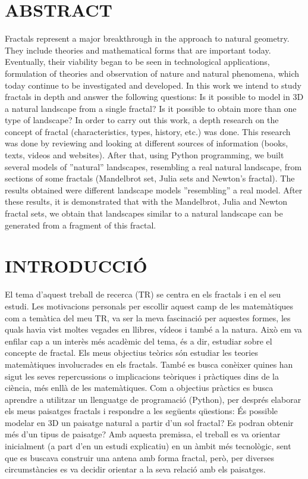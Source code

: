 \documentclass[12pt,a4paper]{report}
\begin{document}
\chapter*{ABSTRACT}
Fractals represent a major breakthrough in the approach to natural geometry. They include theories and mathematical forms that are important today. Eventually, their viability began to be seen in technological applications, formulation of theories and observation of nature and natural phenomena, which today continue to be investigated and developed. In this work we intend to study fractals in depth and answer the following questions: Is it possible to model in 3D a natural landscape from a single fractal? Is it possible to obtain more than one type of landscape? In order to carry out this work, a depth research on the concept of fractal (characteristics, types, history, etc.) was done. This research was done by reviewing and looking at different sources of information (books, texts, videos and websites). After that, using Python programming, we built several models of ''natural'' landscapes, resembling a real natural landscape, from sections of some fractals (Mandelbrot set, Julia sets and Newton's fractal). The results obtained were different landscape models ''resembling'' a real model. After these results, it is demonstrated that with the Mandelbrot, Julia and Newton fractal sets, we obtain that landscapes similar to a natural landscape can be generated from a fragment of this fractal.

\chapter{INTRODUCCIÓ}
El tema d’aquest treball de recerca (TR) se centra en els fractals i en el seu estudi. Les motivacions personals per escollir aquest camp de les matemàtiques com a temàtica del meu TR, va ser la meva fascinació per aquestes formes, les quals havia vist moltes vegades en llibres, vídeos i també a la natura. Això em va enfilar cap a un interès més acadèmic del tema, és a dir, estudiar sobre el concepte de fractal. Els meus objectius teòrics són estudiar les teories matemàtiques involucrades en els fractals. També es busca conèixer quines han sigut les seves repercussions o implicacions teòriques i pràctiques dins de la ciència, més enllà de les matemàtiques. Com a objectius pràctics es busca aprendre a utilitzar un llenguatge de programació (Python), per després elaborar els meus paisatges fractals i respondre a les següents qüestions: És possible modelar en 3D un paisatge natural a partir d'un sol fractal? Es podran obtenir més d’un tipus de paisatge? Amb aquesta premissa, el treball es va orientar inicialment (a part d'en un estudi explicatiu) en un àmbit més tecnològic, sent que es buscava construir una antena amb forma fractal, però, per diverses circumstàncies es va decidir orientar a la seva relació amb els paisatges.
\end{document}
